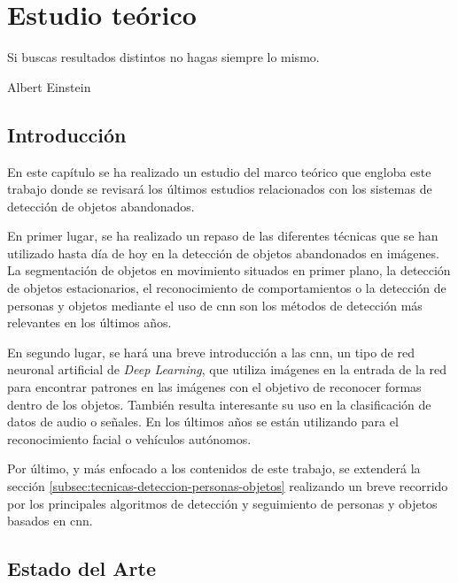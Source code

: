
\chapter{Estudio teórico}
\label{cha:estudio-teórico}

\begin{FraseCelebre}
  \begin{Frase}
    Si buscas resultados distintos no hagas siempre lo mismo.
  \end{Frase}
  \begin{Fuente}
    Albert Einstein
  \end{Fuente}
\end{FraseCelebre}

\section{Introducción}
\label{sec:intro-sota}

En este capítulo se ha realizado un estudio del marco teórico que engloba este trabajo donde se revisará los últimos estudios relacionados con los sistemas de detección de objetos abandonados. 

En primer lugar, se ha realizado un repaso de las diferentes técnicas que se han utilizado hasta día de hoy en la detección de objetos abandonados en imágenes. La segmentación de objetos en movimiento situados en primer plano, la detección de objetos estacionarios, el reconocimiento de comportamientos o la detección de personas y objetos mediante el uso de \gls{cnn} son los métodos de detección más relevantes en los últimos años.

En segundo lugar, se hará una breve introducción a las \gls{cnn}, un tipo de red neuronal artificial de \textit{Deep Learning}, que utiliza imágenes en la entrada de la red para encontrar patrones en las imágenes con el objetivo de reconocer formas dentro de los objetos. También resulta interesante su uso en la clasificación de datos de audio o señales. En los últimos años se están utilizando para el reconocimiento facial o vehículos autónomos.

Por último, y más enfocado a los contenidos de este trabajo, se extenderá la sección \ref{subsec:tecnicas-deteccion-personas-objetos} realizando un breve recorrido por los principales algoritmos de detección y seguimiento de personas y objetos basados en \gls{cnn}.

\section{Estado del Arte}
\label{sec:estado-del-arte}

